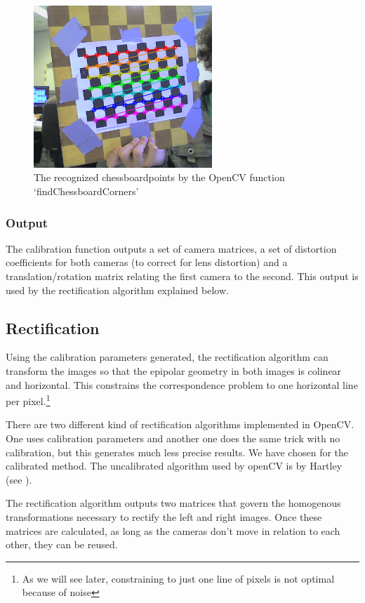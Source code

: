 \documentclass[a4paper]{article}
\begin{document}
\begin{figure} [h!tb]
\centering
  \includegraphics[width=0.6\textwidth]{chessboardcorners}
  \caption{The recognized chessboardpoints by the OpenCV function
`findChessboardCorners'\label{chessboardcorners}}
\end{figure}

\subsubsection{Output} The calibration function outputs a set of
camera matrices, a set of distortion coefficients for both cameras (to
correct for lens distortion) and a translation/rotation matrix
relating the first camera to the second. This output is used by the
rectification algorithm explained below.

\subsection{Rectification} Using the calibration parameters generated,
the rectification algorithm can transform the images so that the
epipolar geometry in both images is colinear and horizontal. This
constrains the correspondence problem to one horizontal line per
pixel.\footnote{As we will see later, constraining to just one line of
pixels is not optimal because of noise}

There are two different kind of rectification algorithms implemented
in OpenCV. One uses calibration parameters and another one does the
same trick with no calibration, but this generates much less precise
results. We have chosen for the calibrated method. The uncalibrated
algorithm used by openCV is by Hartley (see \cite{Hartley99}).

The rectification algorithm outputs two matrices that govern the
homogenous transformations necessary to rectify the left and right
images. Once these matrices are calculated, as long as the cameras
don't move in relation to each other, they can be reused.
\end{document}
